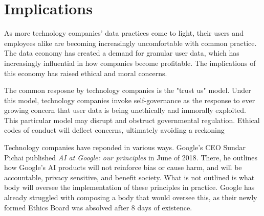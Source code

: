 \section{Implications}

As more technology companies' data practices come to light, their users and
employees alike are becoming increasingly uncomfortable with common practice.
The data economy has created a demand for granular user data, which has
increasingly influential in how companies become profitable. The implications
of this economy has raised ethical and moral concerns.

The common resposne by technology companies is the "trust us" model. Under this
model, technology companies invoke self-governance as the response to ever
growing concern that user data is being unethically and immorally exploited.
This particular model may disrupt and obstruct governmental regulation. Ethical
codes of conduct will deflect concerns, ultimately avoiding a reckoning~\cite{whittaker2018ai}

Technology companies have reponded in various ways. Google's CEO Sundar Pichai
published \textit{AI at Google: our principles} in June of 2018. There, he
outlines how Google's AI products will not reinforce bias or cause harm, and
will be accountable, privacy sensitive, and benefit society. What is not
outlined is what body will oversee the implementation of these principles in
practice. Google has already struggled with composing a body that would oversee
this, as their newly formed Ethics Board was absolved after 8 days of existence.


